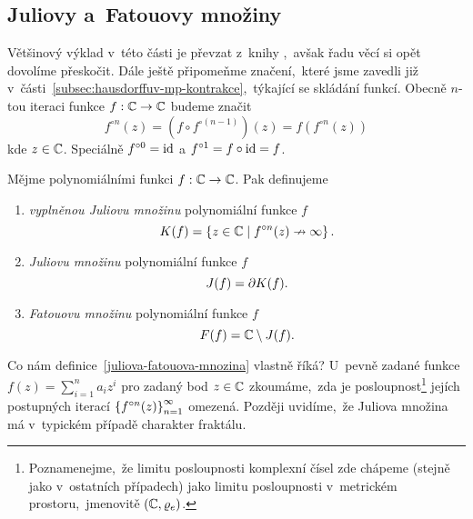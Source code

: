 \subsection{Juliovy a~Fatouovy množiny}\label{subsec:juliovy-fatouovy-mnoziny}

Většinový výklad v~této části je převzat z~knihy \cite[str. 235]{Falconer1989},~avšak řadu věcí si opět dovolíme přeskočit. Dále ještě připomeňme značení,~které jsme zavedli již v~části~\ref{subsec:hausdorffuv-mp-kontrakce},~týkající se skládání funkcí. Obecně $n$-tou iteraci funkce $f:\mathbb{C} \rightarrow \mathbb{C}$ budeme značit
\[f^{\circ n}(z)=(f\circ f^{\circ(n-1)})(z)=f(f^{\circ n}(z))\]
kde $z\in\mathbb{C}$. Speciálně $f^{\circ 0}=\operatorname{id}$ a $f^{\circ 1}=f\circ\operatorname{id}=f$.
\begin{definition}\label{juliova-fatouova-mnozina}
    Mějme polynomiálními funkci $f:\mathbb{C} \rightarrow \mathbb{C}$. Pak definujeme
    \begin{enumerate}[label=(\alph*)]
        \item \emph{vyplněnou Juliovu množinu} polynomiální funkce $f$
        \[K(f)=\left\{z\in\mathbb{C}\mid f^{\circ n}(z)\nrightarrow\infty\right\}.\]
        \item \emph{Juliovu množinu} polynomiální funkce $f$
        \[J(f)=\partial K(f).\]
        \item \emph{Fatouovu množinu} polynomiální funkce $f$
        \[F(f)=\mathbb{C}\setminus J(f).\]
    \end{enumerate}
\end{definition}
Co nám definice~\ref{juliova-fatouova-mnozina} vlastně říká? U~pevně zadané funkce $f(z)=\sum_{i=1}^{n}a_iz^i$ pro zadaný bod $z\in\mathbb{C}$ zkoumáme,~zda je posloupnost\footnote{Poznamenejme,~že limitu posloupnosti komplexní čísel zde chápeme (stejně jako v~ostatních případech) jako limitu posloupnosti v~metrickém prostoru,~jmenovitě $(\mathbb{C},\varrho_e)$.} jejích postupných iterací $\left\{f^{\circ n}(z)\right\}_{n=1}^\infty$ omezená. Později uvidíme,~že Juliova množina má v~typickém případě charakter fraktálu.

